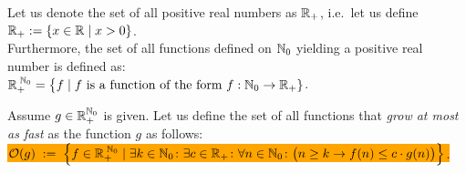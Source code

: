 Let us denote the set of all positive real numbers as ${\mathbb R}_+$, i.e.~let us define 
\\[0.2cm]
\hspace*{1.3cm}
${\mathbb R}_+ := \{ x \in {\mathbb R} \mid x > 0 \}$. 
\\[0.2cm]
Furthermore, the set of all functions defined on  ${\mathbb N}_0$ yielding a positive real number is defined
as: 
\\[0.2cm]
\hspace*{1.3cm} 
${\mathbb R}_+^{\;{\mathbb N}_0} = \bigl\{ f \mid \mbox{$f$ is a function of the form $f: {\mathbb N}_0 \rightarrow {\mathbb R}_+$} \}$.

\begin{Definition}[$\Oh(g)$] 
Assume $g \in {\mathbb R}_+^{{\mathbb N}_0}$ is given.   Let us define the set of all functions that \emph{grow at most as fast}
  as the function $g$ as follows:
  \\[0.2cm]
  \hspace*{0.5cm} 
  \colorbox{orange}{
  $ \mathcal{O}(g) \;:=\; \left\{ f \in {\mathbb R}_+^{\;{\mathbb N}_0} \mid \exists k \in {\mathbb N}_0 \colon 
    \exists c \in {\mathbb R}_+\colon \forall n \in {\mathbb N}_0 \colon \bigl(n \geq k \rightarrow f(n) \leq c \cdot g(n)\bigr) \right\}$.}
  \eox
\end{Definition}


